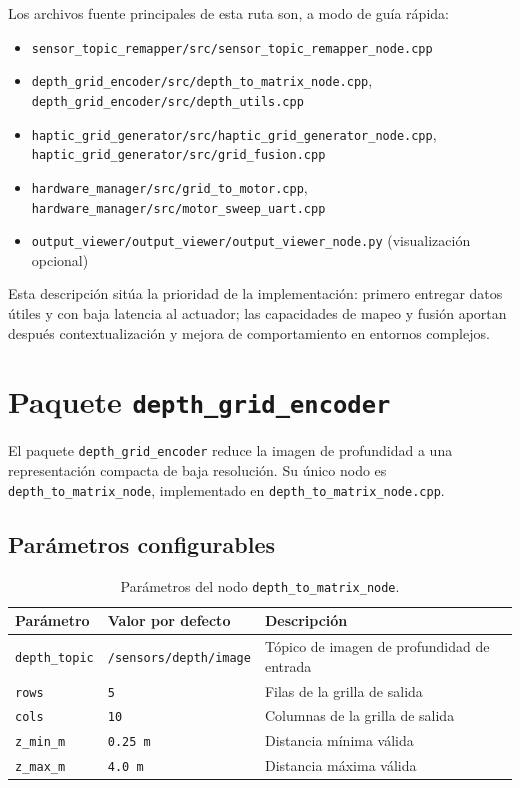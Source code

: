 Los archivos fuente principales de esta ruta son, a modo de guía rápida:
\begin{itemize}
  \item \texttt{sensor\_topic\_remapper/src/sensor\_topic\_remapper\_node.cpp}
  \item \texttt{depth\_grid\_encoder/src/depth\_to\_matrix\_node.cpp}, \texttt{depth\_grid\_encoder/src/depth\_utils.cpp}
  \item \texttt{haptic\_grid\_generator/src/haptic\_grid\_generator\_node.cpp}, \texttt{haptic\_grid\_generator/src/grid\_fusion.cpp}
  \item \texttt{hardware\_manager/src/grid\_to\_motor.cpp}, \texttt{hardware\_manager/src/motor\_sweep\_uart.cpp}
  \item \texttt{output\_viewer/output\_viewer/output\_viewer\_node.py} (visualización opcional)
\end{itemize}

Esta descripción sitúa la prioridad de la implementación: primero entregar datos útiles y con baja latencia al actuador; las capacidades de mapeo y fusión aportan después contextualización y mejora de comportamiento en entornos complejos.

\section{Paquete \texttt{depth\_grid\_encoder}}
\label{sec:impl-depth-grid-encoder}

El paquete \texttt{depth\_grid\_encoder} reduce la imagen de profundidad a una representación compacta de baja resolución. Su único nodo es \texttt{depth\_to\_matrix\_node}, implementado en \texttt{depth\_to\_matrix\_node.cpp}.

\subsection{Parámetros configurables}

\begin{table}[h]
\centering
\begin{tabular}{lll}
\hline
\textbf{Parámetro} & \textbf{Valor por defecto} & \textbf{Descripción} \\
\hline
\texttt{depth\_topic}  & \texttt{/sensors/depth/image} & Tópico de imagen de profundidad de entrada \\
\texttt{rows}          & \texttt{5}                    & Filas de la grilla de salida               \\
\texttt{cols}          & \texttt{10}                   & Columnas de la grilla de salida            \\
\texttt{z\_min\_m}     & \texttt{0.25\,m}              & Distancia mínima válida                    \\
\texttt{z\_max\_m}     & \texttt{4.0\,m}               & Distancia máxima válida                    \\
\hline
\end{tabular}
\caption{Parámetros del nodo \texttt{depth\_to\_matrix\_node}.}
\label{tab:depth-grid-params}
\end{table}


